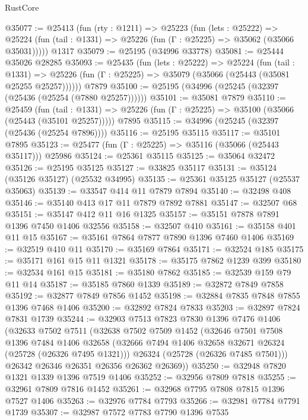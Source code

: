 \begin{lexlean}{RustCore}
\begin{coremodule}
@35077 := @25413
    (fun (rty : @1211) =>
    @25223
      (fun (lets : @25222) =>
      @25224 (fun (tail : @1331) => @25226 (fun (Γ : @25225) => @35062 (@35066 @35031)))))
    @1317
@35079 := @25195 (@34996 @33778)
@35081 := @25444 @35026 @28285
@35093 := @25435
    (fun (lets : @25222) =>
    @25224
      (fun (tail : @1331) =>
      @25226 (fun (Γ : @25225) => @35079 (@35066 (@25443 (@35081 @25255 @25257))))))
    @7879
@35100 := @25195 (@34996 (@25245 (@32397 (@25436 (@25254 (@7880 @25257))))))
@35101 := @35081 @7879
@35110 := @25459
    (fun (tail : @1331) => @25226 (fun (Γ : @25225) => @35100 (@35066 (@25443 (@35101 @25257)))))
    @7895
@35115 := @34996 (@25245 (@32397 (@25436 (@25254 @7896))))
@35116 := @25195 @35115
@35117 := @35101 @7895
@35123 := @25477 (fun (Γ : @25225) => @35116 (@35066 (@25443 @35117))) @25986
@35124 := @25361 @35115
@35125 := @35064 @32472
@35126 := @25195 @35125
@35127 := @33825 @35117
@35131 := @35124 (@35126 @35127) (@25532 @34995)
@35135 := @25361 @35125 @35127 (@25537 @35063)
@35139 := @33547 @414 @11 @7879 @7894
@35140 := @32498 @408
@35146 := @35140 @413 @17 @11 @7879 @7892 @7881
@35147 := @32507 @68
@35151 := @35147 @412 @11 @16 @1325
@35157 := @35151 @7878 @7891 @1396 @7450 @1406 @32556
@35158 := @32507 @410
@35161 := @35158 @401 @11 @15
@35167 := @35161 @7864 @7877 @7890 @1396 @7460 @1406
@35169 := @32519 @410 @11
@35170 := @35169 @7864
@35171 := @32524 @185
@35175 := @35171 @161 @15 @11 @1321
@35178 := @35175 @7862 @1239 @399
@35180 := @32534 @161 @15
@35181 := @35180 @7862
@35185 := @32539 @159 @79 @11 @14
@35187 := @35185 @7860 @1339
@35189 := @32872 @7849 @7858
@35192 := @32877 @7849 @7856 @1452
@35198 := @32884 @7835 @7848 @7855 @1396 @7468 @1406
@35200 := @32892 @7824 @7833
@35203 := @32897 @7824 @7831 @1739
@35244 := @32903
    @7513
    @7823
    @7830
    @1396
    @7476
    @1406
    (@32633
      @7502
      @7511
      (@32638
        @7502
        @7509
        @1452
        (@32646
          @7501
          @7508
          @1396
          @7484
          @1406
          @32658
          (@32666 @7494 @1406 @32658 @32671 @26324 (@25728 (@26326 @7495 @1321)))
          @26324
          (@25728 (@26326 @7485 @7501)))
        @26342
        @26346
        @26351
        @26356
        @26362
        @26369))
@35250 := @32948 @7820 @1321 @1339 @1396 @7519 @1406
@35252 := @32956 @7809 @7818
@35255 := @32961 @7809 @7816 @1452
@35261 := @32968 @7795 @7808 @7815 @1396 @7527 @1406
@35263 := @32976 @7784 @7793
@35266 := @32981 @7784 @7791 @1739
@35307 := @32987
    @7572
    @7783
    @7790
    @1396
    @7535

\end{coremodule}
\end{lexlean}
